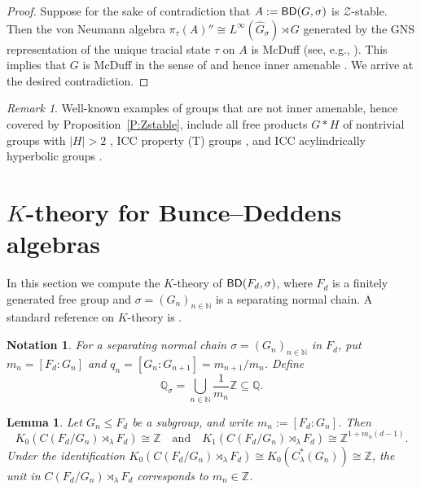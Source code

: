 \documentclass[11pt,a4,leqno]{amsart}
\newtheorem{lemma}[thm]{Lemma}
\newtheorem{notation}[thm]{Notation}
\theoremstyle{definition}
\theoremstyle{remark}
\newtheorem{rem}[thm]{Remark}
\numberwithin{equation}{section}
\theoremstyle{plain}
\newcommand{\Nb}{\mathbb{N}}
\newcommand{\Zb}{\mathbb{Z}}
\newcommand{\Qb}{\mathbb{Q}}
\newcommand{\BD}{{\sf{BD}}}
\begin{document}
\begin{proof}
    Suppose for the sake of contradiction that $A:= \BD (G,\sigma)$ is $\mathcal{Z}$-stable. Then the von Neumann algebra $\pi_\tau(A)''\cong L^\infty(\widehat{G}_\sigma)\rtimes G$ generated by the GNS representation of the unique tracial state $\tau$ on $A$ is McDuff (see, e.g., \cite[Proposition 5.17]{CarCasEviGabSchTikWhi24}). This implies that $G$ is McDuff in the sense of \cite{DepVae18} and hence inner amenable \cite[Proposition 4.1]{DepVae18}. We arrive at the desired contradiction. 
\end{proof}

\begin{rem}\label{R:inn_amen}
    Well-known examples of groups that are not inner amenable, hence covered by Proposition~\ref{P:Zstable}, include all free products $G * H$ of nontrivial groups with $|H| > 2$ \cite{Eff75}, ICC property (T) groups \cite[Theorem 11]{AkeWal81}, and ICC acylindrically hyperbolic groups \cite[Theorem 2.35]{DahGuiOsi17}. 
\end{rem}

\section{$K$-theory for Bunce--Deddens algebras}\label{S:Kthy}

In this section we compute the $K$-theory of $\BD(F_d,\sigma)$, where $F_d$ is a finitely generated free group and $\sigma = (G_n)_{n\in\Nb}$ is a separating normal chain. A standard reference on $K$-theory is \cite{RorLarLau00}. 

\begin{notation}\label{N:chain}
For a separating normal chain $\sigma = (G_n)_{n\in \Nb}$ in $F_d$, put $m_n = [F_d: G_n]$ and $q_n = [G_n : G_{n+1}] = m_{n+1} / m_n$. Define 
\[
    \Qb_\sigma = \bigcup_{n\in \Nb} \frac{1}{m_n}\Zb \subseteq \Qb. 
\]
\end{notation}

\begin{lemma}\label{L:fin_stage}
    Let $G_n \le F_d$ be a subgroup, and write $m_n := [F_d:G_n]$. Then  
    \[
        K_0(C(F_d/G_n)\rtimes_\lambda F_d) \cong \Zb \quad \text{and} \quad K_1(C(F_d/G_n)\rtimes_\lambda F_d) \cong \Zb^{1+m_n(d-1)}.  
    \]
    Under the identification $K_0(C(F_d/G_n)\rtimes_\lambda F_d) \cong K_0(C^*_\lambda(G_n)) \cong \Zb$, the unit in $C(F_d/G_n)\rtimes_\lambda F_d$ corresponds to $m_n \in \Zb$.
\end{lemma}
\end{document}
